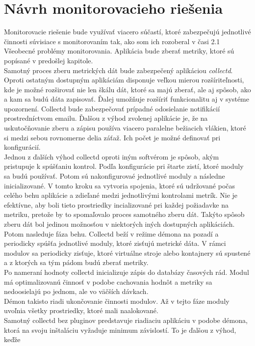 \documentclass[12pt,twoside,color,cover,table]{fithesis3}
\begin{document}
\section{Návrh monitorovacieho riešenia}
Monitorovacie riešenie bude využívať viacero súčastí, ktoré zabezpečujú jednotlivé činnosti súvisiace s monitorovaním tak, ako som ich rozoberal v časi 2.1 Všeobecné problémy monitorovania.
Aplikácia bude zberať metriky, ktoré sú popísané v predošlej kapitole. 
\\Samotný proces zberu metrických dát bude zabezpečený aplikáciou \emph{collectd}. Oproti ostatným dostupným aplikáciám disponuje
veľkou mierou rozšíriteľnosti, kde je možné rozširovať nie len škálu dát, ktoré sa majú zberať, ale aj spôsob, ako a kam sa budú dáta zapisovať. Ďalej umožňuje rozšíriť funkcionalitu
aj v systéme upozornení. Collectd bude zabezpečovať prípadné odosielanie notifikácií prostredníctvom emailu. Ďalšou z výhod zvolenej aplikácie je, že na uskutočňovanie zberu a zápisu používa viacero
paralelne bežiacich vlákien, ktoré si medzi sebou rovnomerne delia záťaž. Ich počet je možné definovať pri konfigurácií. 
\\Jednou z ďalších výhod collectd oproti iným softvérom je spôsob, akým pristupuje k spúšťaniu kontrol. Podľa konfigurácie pri štarte zistí, ktoré moduly sa budú používať. Potom sú nakonfigurovaé 
jednotlivé moduly a následne inicializované. V tomto kroku sa vytvoria spojenia, ktoré sú udržované počas celého behu aplikácie a zdieľané medzi jednotlivými kontrolami metrík. Nie je efektívne, aby boli 
tieto prostriedky incializované pri
každej požiadavke na metriku, pretože by to spomaľovalo proces samotného zberu dát. Takýto spôsob zberu dát bol jedinou možnosťou v niektorých iných dostupných aplikáciách.
\\Potom nasleduje fáza behu. Collectd beží v režime démona na pozadí a periodicky spúšťa jednotlivé moduly, ktoré zisťujú metrické dáta. 
V rámci modulov sa periodicky zisťuje, ktoré virtuálne stroje alebo kontajnery sú spustené a z ktorých sa tým pádom budú zberať metriky. 
\\Po nameraní hodnoty collectd inicializuje zápis do databázy časových rád. Modul má optimalizovanú činnosť v podobe cachovania
hodnôt a metriky sa nedoosielajú po jednom, ale vo väčších dávkach.
\\Démon takisto riadi ukončovanie činnosti modulov. Až v tejto fáze moduly uvoľnia všetky prostriedky, ktoré mali naalokované.
\\Samotný collectd bez pluginov predstavuje riadiaciu aplikáciu v podobe démona, ktorá na svoju inštaláciu vyžaduje minimum závislostí. To je ďalšou z výhod, keďže 
\end{document}
